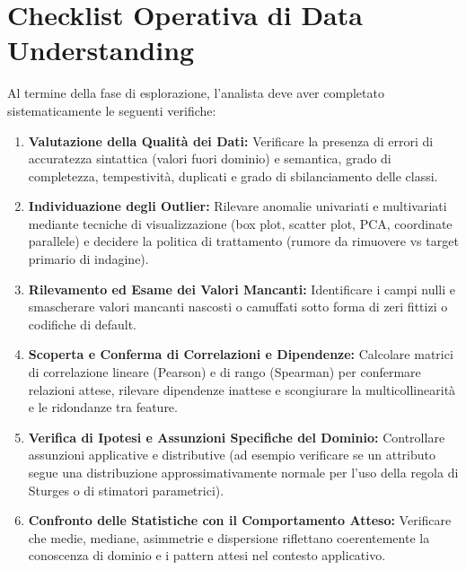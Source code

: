 \section{Checklist Operativa di Data Understanding}
Al termine della fase di esplorazione, l'analista deve aver completato sistematicamente le seguenti verifiche:
\begin{enumerate}
    \item \textbf{Valutazione della Qualit\`a dei Dati:} Verificare la presenza di errori di accuratezza sintattica (valori fuori dominio) e semantica, grado di completezza, tempestivit\`a, duplicati e grado di sbilanciamento delle classi.
    \item \textbf{Individuazione degli Outlier:} Rilevare anomalie univariati e multivariati mediante tecniche di visualizzazione (box plot, scatter plot, PCA, coordinate parallele) e decidere la politica di trattamento (rumore da rimuovere vs target primario di indagine).
    \item \textbf{Rilevamento ed Esame dei Valori Mancanti:} Identificare i campi nulli e smascherare valori mancanti nascosti o camuffati sotto forma di zeri fittizi o codifiche di default.
    \item \textbf{Scoperta e Conferma di Correlazioni e Dipendenze:} Calcolare matrici di correlazione lineare (Pearson) e di rango (Spearman) per confermare relazioni attese, rilevare dipendenze inattese e scongiurare la multicollinearit\`a e le ridondanze tra feature.
    \item \textbf{Verifica di Ipotesi e Assunzioni Specifiche del Dominio:} Controllare assunzioni applicative e distributive (ad esempio verificare se un attributo segue una distribuzione approssimativamente normale per l'uso della regola di Sturges o di stimatori parametrici).
    \item \textbf{Confronto delle Statistiche con il Comportamento Atteso:} Verificare che medie, mediane, asimmetrie e dispersione riflettano coerentemente la conoscenza di dominio e i pattern attesi nel contesto applicativo.
\end{enumerate}

